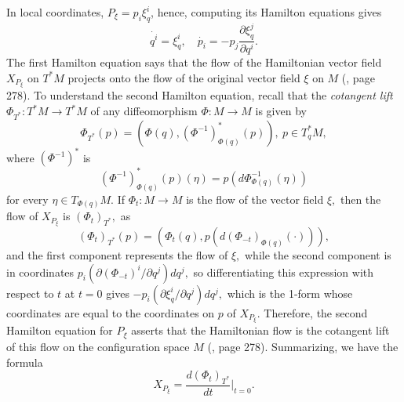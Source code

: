 \documentclass[12pt, letterpaper, reqno]{amsart}
\theoremstyle{definition}
\theoremstyle{plain}
\theoremstyle{remark}
\begin{document}
In local coordinates, $ P_\xi = p_i \xi_q^i $, hence, computing its Hamilton equations gives
$$ \dot{q^i} = \xi_q^i,\quad \dot{p_i} = -p_j \frac{\partial \xi_q^j}{\partial q^i}.  $$ 
The first Hamilton equation says that the flow of the Hamiltonian vector field $ X_{P_\xi} $ on $ T^*M $ projects onto the flow of the original vector field $ \xi $ on $ M $ (\cite{montgomery2002tour}, page 278). To understand the second Hamilton equation, recall that the \textit{cotangent lift} $ \Phi_{T^*}: T^*M \rightarrow T^*M $ of any diffeomorphism $ \Phi : M \rightarrow M $ is given by 
$$ \Phi_{T^*}(p) = (\Phi(q), (\Phi^{-1})^*_{\Phi(q)}(p)),\ p\in T^*_qM,$$ 
where $ (\Phi^{-1})^* $ is 
$$ (\Phi^{-1})^*_{\Phi(q)}(p)(\eta) = p \left( d\Phi^{-1}_{\Phi(q)}(\eta) \right) $$ 
for every $ \eta\in T_{\Phi(q)}M. $ If $ \Phi_t: M \rightarrow M $ is the flow of the vector field $ \xi, $ then the flow of $ X_{P_\xi} $ is $ (\Phi_t)_{T^*}, $ as
$$ (\Phi_t)_{T^*}(p) = \left( \Phi_t(q), p \left( d(\Phi_{-t})_{\Phi(q)}(\cdot) \right) \right), $$ 
and the first component represents the flow of $ \xi, $ while the second component is in coordinates $ p_i (\partial (\Phi_{-t})^i/\partial q^j)dq^j, $ so differentiating this expression with respect to $ t $ at $ t=0 $ gives $ -p_i (\partial \xi_q^i/\partial q^j)dq^j, $ which is the 1-form whose coordinates are equal to the coordinates on $ p $ of $ X_{P_\xi} $. Therefore, the second Hamilton equation for $ P_\xi $ asserts that the Hamiltonian flow is the cotangent lift of this flow on the configuration space $ M $ (\cite{montgomery2002tour}, page 278). Summarizing, we have the formula 
$$ X_{P_\xi} = \frac{d(\Phi_t)_{T^*}}{dt} \Big|_{t=0}.  $$ 
\end{document}
